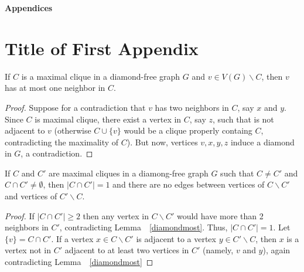 \documentclass[12pt,a4paper,titlepage,openany]{report}
\begin{document}
\newpage


\pagestyle{fancyplain}
\vspace*{\fill}
     \begin{center}
          \bf{\Huge{Appendices}}
     \end{center}
\vspace*{\fill}
\thispagestyle{fancy}

\appendix
\thispagestyle{empty}

\chapter{Title of First Appendix}
\thispagestyle{empty}

\begin{lemma}\label{diamondmost}
If $C$ is a maximal clique in a diamond-free graph $G$ and $v\in V(G)\backslash C$, then $v$ has at most one neighbor in $C$.
\end{lemma}
\begin{proof}
Suppose for a contradiction that $v$ has two neighbors in $C$, say $x$ and $y$. Since $C$ is maximal clique, there exist a vertex in $C$, say $z$, such that is not adjacent to $v$ (otherwise $C\cup \{v\}$ would be a clique properly containg $C$, contradicting the maximality of $C$). But now, vertices $v,x,y,z$ induce a diamond in $G$, a contradiction. 
\end{proof}
\begin{corollary}\label{maxcliquedia}
If $C$ and $C'$ are maximal cliques in a diamong-free graph $G$ such that $C\neq C'$ and $C\cap C'\neq \emptyset$, then $|C\cap C'|= 1$ and there are no edges between vertices of $C\backslash C'$ and vertices of $C'\backslash C$.
\end{corollary}
\begin{proof}
If $|C\cap C'|\geq 2$ then any vertex in $C\backslash C'$ would have more than 2 neighbors in $C'$, contradicting Lemma~~\ref{diamondmost}. Thus, $|C\cap C'|=1$. Let $\{v\}= C\cap C'$. If a vertex $x\in C\backslash C'$ is adjacent to a vertex $y\in C'\backslash C$, then $x$ is a vertex not in $C'$ adjacent to at least two vertices in $C'$ (namely, $v$ and $y$), again contradicting Lemma~~\ref{diamondmost}
\end{proof}
\end{document}
